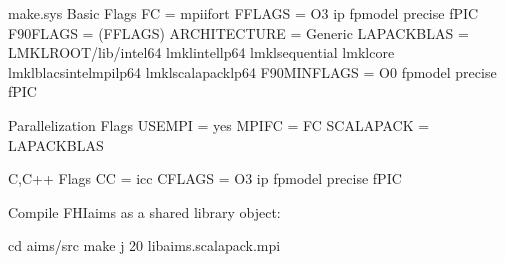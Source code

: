 \documentclass[letterpaper,10pt,english]{sphinxmanual}
\begin{document}
\begin{sphinxVerbatim}[commandchars=\\\{\}]
\PYGZsh{} make.sys
\PYGZsh{}\PYGZsh{}\PYGZsh{}\PYGZsh{}\PYGZsh{}\PYGZsh{}\PYGZsh{}\PYGZsh{}\PYGZsh{}\PYGZsh{}\PYGZsh{}\PYGZsh{}\PYGZsh{}\PYGZsh{}\PYGZsh{}
\PYGZsh{} Basic Flags \PYGZsh{}
\PYGZsh{}\PYGZsh{}\PYGZsh{}\PYGZsh{}\PYGZsh{}\PYGZsh{}\PYGZsh{}\PYGZsh{}\PYGZsh{}\PYGZsh{}\PYGZsh{}\PYGZsh{}\PYGZsh{}\PYGZsh{}\PYGZsh{}
FC = mpiifort
FFLAGS = \PYGZhy{}O3 \PYGZhy{}ip \PYGZhy{}fp\PYGZhy{}model precise \PYGZhy{}fPIC
F90FLAGS = \PYGZdl{}(FFLAGS)
ARCHITECTURE = Generic
LAPACKBLAS = \PYGZhy{}L\PYGZdl{}\PYGZob{}MKLROOT\PYGZcb{}/lib/intel64 \PYGZbs{}
             \PYGZhy{}lmkl\PYGZus{}intel\PYGZus{}lp64 \PYGZbs{}
             \PYGZhy{}lmkl\PYGZus{}sequential \PYGZbs{}
             \PYGZhy{}lmkl\PYGZus{}core \PYGZbs{}
             \PYGZhy{}lmkl\PYGZus{}blacs\PYGZus{}intelmpi\PYGZus{}lp64 \PYGZbs{}
             \PYGZhy{}lmkl\PYGZus{}scalapack\PYGZus{}lp64
F90MINFLAGS = \PYGZhy{}O0 \PYGZhy{}fp\PYGZhy{}model precise \PYGZhy{}fPIC

\PYGZsh{}\PYGZsh{}\PYGZsh{}\PYGZsh{}\PYGZsh{}\PYGZsh{}\PYGZsh{}\PYGZsh{}\PYGZsh{}\PYGZsh{}\PYGZsh{}\PYGZsh{}\PYGZsh{}\PYGZsh{}\PYGZsh{}\PYGZsh{}\PYGZsh{}\PYGZsh{}\PYGZsh{}\PYGZsh{}\PYGZsh{}\PYGZsh{}\PYGZsh{}\PYGZsh{}\PYGZsh{}
\PYGZsh{} Parallelization Flags \PYGZsh{}
\PYGZsh{}\PYGZsh{}\PYGZsh{}\PYGZsh{}\PYGZsh{}\PYGZsh{}\PYGZsh{}\PYGZsh{}\PYGZsh{}\PYGZsh{}\PYGZsh{}\PYGZsh{}\PYGZsh{}\PYGZsh{}\PYGZsh{}\PYGZsh{}\PYGZsh{}\PYGZsh{}\PYGZsh{}\PYGZsh{}\PYGZsh{}\PYGZsh{}\PYGZsh{}\PYGZsh{}\PYGZsh{}
USE\PYGZus{}MPI = yes
MPIFC = \PYGZdl{}\PYGZob{}FC\PYGZcb{}
SCALAPACK = \PYGZdl{}\PYGZob{}LAPACKBLAS\PYGZcb{}

\PYGZsh{}\PYGZsh{}\PYGZsh{}\PYGZsh{}\PYGZsh{}\PYGZsh{}\PYGZsh{}\PYGZsh{}\PYGZsh{}\PYGZsh{}\PYGZsh{}\PYGZsh{}\PYGZsh{}\PYGZsh{}\PYGZsh{}
\PYGZsh{} C,C++ Flags \PYGZsh{}
\PYGZsh{}\PYGZsh{}\PYGZsh{}\PYGZsh{}\PYGZsh{}\PYGZsh{}\PYGZsh{}\PYGZsh{}\PYGZsh{}\PYGZsh{}\PYGZsh{}\PYGZsh{}\PYGZsh{}\PYGZsh{}\PYGZsh{}
CC = icc
CFLAGS = \PYGZhy{}O3 \PYGZhy{}ip \PYGZhy{}fp\PYGZhy{}model precise \PYGZhy{}fPIC
\end{sphinxVerbatim}

Compile FHI\sphinxhyphen{}aims as a shared library object:

\begin{sphinxVerbatim}[commandchars=\\\{\}]
cd \PYGZdl{}aims/src
make \PYGZhy{}j 20 libaims.scalapack.mpi
\end{sphinxVerbatim}
\end{document}
